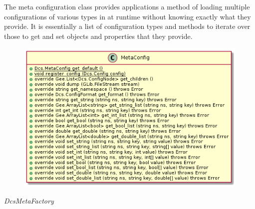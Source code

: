       \vspace*{-0.75cm}
      \begin{minipage}[t]{0.5\textwidth}
        \vspace*{0.5cm}
        The meta configuration class provides applications a method of loading
        multiple configurations of various types in at runtime without knowing
        exactly what they provide. It is essentially a list of configuration
        types and methods to iterate over those to get and set objects and
        properties that they provide.
      \end{minipage} \hfill
      \begin{minipage}[t]{0.45\textwidth}
        \begin{figure}[H]
          \includegraphics[width=\textwidth]{figures/design/class/core/meta-config}
          \label{fig:dsg-classes-meta-config}
        \end{figure}
      \end{minipage}

      \emph{DcsMetaFactory}

